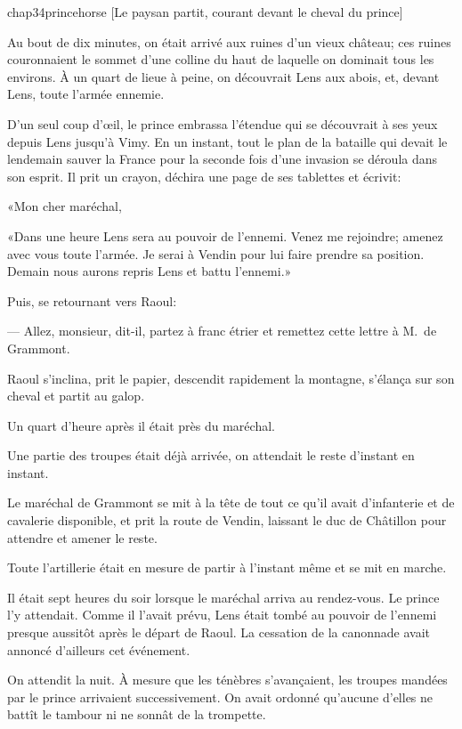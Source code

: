 \begin{bwbigpic}
	[\basicscale] 
	{chap34princehorse}
	[Le paysan partit, courant devant le cheval du prince]
\end{bwbigpic}

Au bout de dix minutes, on était arrivé aux ruines d'un vieux château; ces ruines couronnaient le sommet d'une colline du haut de laquelle on dominait tous les environs. À un quart de lieue à peine, on découvrait Lens aux abois, et, devant Lens, toute l'armée ennemie.

D'un seul coup d'œil, le prince embrassa l'étendue qui se découvrait à ses yeux depuis Lens jusqu'à Vimy. En un instant, tout le plan de la bataille qui devait le lendemain sauver la France pour la seconde fois d'une invasion se déroula dans son esprit. Il prit un crayon, déchira une page de ses tablettes et écrivit:

«Mon cher maréchal,

«Dans une heure Lens sera au pouvoir de l'ennemi. Venez me rejoindre; amenez avec vous toute l'armée. Je serai à Vendin pour lui faire prendre sa position. Demain nous aurons repris Lens et battu l'ennemi.»

Puis, se retournant vers Raoul:

— Allez, monsieur, dit-il, partez à franc étrier et remettez cette lettre à M.~de Grammont.

Raoul s'inclina, prit le papier, descendit rapidement la montagne, s'élança sur son cheval et partit au galop.

Un quart d'heure après il était près du maréchal.

Une partie des troupes était déjà arrivée, on attendait le reste d'instant en instant.

Le maréchal de Grammont se mit à la tête de tout ce qu'il avait d'infanterie et de cavalerie disponible, et prit la route de Vendin, laissant le duc de Châtillon pour attendre et amener le reste.

Toute l'artillerie était en mesure de partir à l'instant même et se mit en marche.

Il était sept heures du soir lorsque le maréchal arriva au rendez-vous. Le prince l'y attendait. Comme il l'avait prévu, Lens était tombé au pouvoir de l'ennemi presque aussitôt après le départ de Raoul. La cessation de la canonnade avait annoncé d'ailleurs cet événement.

On attendit la nuit. À mesure que les ténèbres s'avançaient, les troupes mandées par le prince arrivaient successivement. On avait ordonné qu'aucune d'elles ne battît le tambour ni ne sonnât de la trompette.

